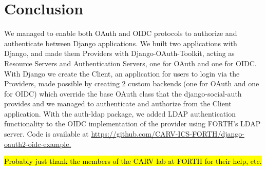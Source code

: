 \section{Conclusion}
We managed to enable both OAuth and OIDC protocols to authorize and authenticate between Django applications. We built two applications with Django, and made them Providers with Django-OAuth-Toolkit, acting as Resource Servers and Authentication Servers, one for OAuth and one for OIDC. With Django we create the Client, an application for users to login via the Providers, made possible by creating 2 custom backends (one for OAuth and one for OIDC) which override the base OAuth class that the django-social-auth provides and we managed to authenticate and authorize from the Client application. With the auth-ldap package, we added LDAP authentication functionality to the OIDC implementation of the provider using FORTH's LDAP server. Code is available at \href{https://github.com/CARV-ICS-FORTH/django-oauth2-oidc-example}{https://github.com/CARV-ICS-FORTH/django-oauth2-oidc-example.}


\begin{acks}
\hl{Probably just thank the members of the CARV lab at FORTH for their help, etc.}
\end{acks}
